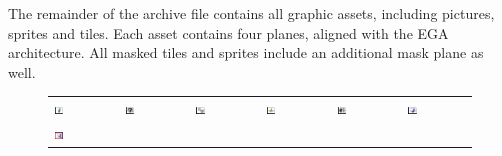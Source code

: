 \documentclass[book.tex]{subfiles}
\begin{document}
\par
The remainder of the archive file contains all graphic assets, including pictures, sprites and tiles. Each asset contains four planes, aligned with the EGA architecture. All masked tiles and sprites include an additional mask plane as well.
 
\begin{figure}[H]
\centering
 \begin{table}[H]
  \begin{tabularx}{\textwidth}[c]{XXXXXX}
  \includegraphics[width=0.15\textwidth]{screenshots_300dpi/game/picture1.png} &
  \includegraphics[width=0.15\textwidth]{screenshots_300dpi/game/picture2.png} &
  \includegraphics[width=0.15\textwidth]{screenshots_300dpi/game/picture3.png} &
  \includegraphics[width=0.15\textwidth]{screenshots_300dpi/game/picture4.png} &
  \includegraphics[width=0.15\textwidth]{screenshots_300dpi/game/picture5.png} &
  \includegraphics[width=0.15\textwidth]{screenshots_300dpi/game/picture6.png} \\
  \includegraphics[width=0.15\textwidth]{screenshots_300dpi/game/picture7.png} &

\end{tabularx}
\end{table}
\end{figure}
\end{document}
